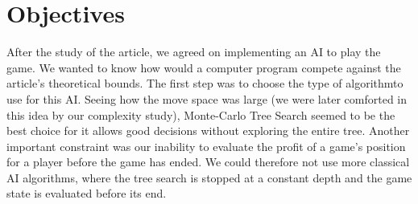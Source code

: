 \section{Objectives}

After the study of the article, we agreed on implementing an AI to play the game. We wanted to know how would a computer program compete against the article's theoretical bounds. The first step was to choose the type of algorithmto use for this AI. Seeing how the move space was large (we were later comforted in this idea by our complexity study), Monte-Carlo Tree Search seemed to be the best choice for it allows good decisions without exploring the entire tree. Another important constraint was our inability to evaluate the profit of a game's position for a player before the game has ended. We could therefore not use more classical AI algorithms, where the tree search is stopped at a constant depth and the game state is evaluated before its end.